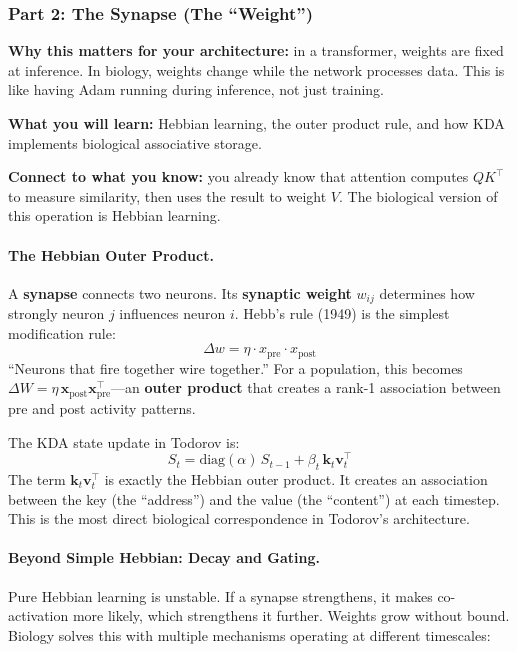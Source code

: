 \documentclass[11pt,a4paper]{article}
\begin{document}
\subsubsection{Part 2: The Synapse (The ``Weight'')}

\textbf{Why this matters for your architecture:} in a transformer, weights are fixed at inference. In biology, weights change while the network processes data. This is like having Adam running during inference, not just training.

\textbf{What you will learn:} Hebbian learning, the outer product rule, and how KDA implements biological associative storage.

\textbf{Connect to what you know:} you already know that attention computes $QK^\top$ to measure similarity, then uses the result to weight $V$. The biological version of this operation is Hebbian learning.

\paragraph{The Hebbian Outer Product.}

A \textbf{synapse} connects two neurons. Its \textbf{synaptic weight} $w_{ij}$ determines how strongly neuron $j$ influences neuron $i$. Hebb's rule (1949) is the simplest modification rule:
\[
  \Delta w = \eta \cdot x_{\mathrm{pre}} \cdot x_{\mathrm{post}}
\]
``Neurons that fire together wire together.'' For a population, this becomes $\Delta W = \eta \, \mathbf{x}_{\mathrm{post}} \mathbf{x}_{\mathrm{pre}}^\top$---an \textbf{outer product} that creates a rank-1 association between pre and post activity patterns.

The KDA state update in Todorov is:
\[
  S_t = \mathrm{diag}(\alpha) \, S_{t-1} + \beta_t \, \mathbf{k}_t \mathbf{v}_t^\top
\]
The term $\mathbf{k}_t \mathbf{v}_t^\top$ is exactly the Hebbian outer product. It creates an association between the key (the ``address'') and the value (the ``content'') at each timestep. This is the most direct biological correspondence in Todorov's architecture.

\paragraph{Beyond Simple Hebbian: Decay and Gating.}

Pure Hebbian learning is unstable. If a synapse strengthens, it makes co-activation more likely, which strengthens it further. Weights grow without bound. Biology solves this with multiple mechanisms operating at different timescales:
\end{document}
